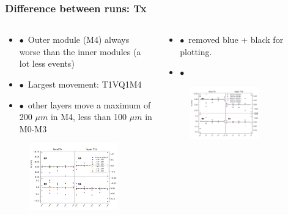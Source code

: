 \documentclass[aspectratio=1610, 12pt]{beamer}
\begin{document}
\begin{frame}\frametitle{Difference between runs: Tx}
  \begin{columns}
    \begin{column}[c]{0.48\textwidth}
      \begin{itemize}
        \item $\bullet$\, Outer module (M4) always worse than the inner modules (a lot less events)
        \item $\bullet$\, Largest movement: T1VQ1M4
        \item $\bullet$\, other layers move a maximum of 200 $\mu m$ in M4, less than 100 $\mu m$ in M0-M3
      \end{itemize}
      \begin{figure}
        \includegraphics[width=0.9\textwidth]{plots/stability_plots/diff_data_T1U_Tx.pdf}
      \end{figure}
    \end{column}
      \begin{column}[c]{0.48\textwidth}
        \begin{itemize}
          \item $\bullet$\, removed blue + black for plotting.
          \item $\bullet$\
        \end{itemize}
        \begin{figure}
          \includegraphics[width=0.7\textwidth]{plots/stability_plots/diff_reduced_Tx_T1U_Tx.pdf}

\end{figure}
\end{column}
\end{columns}
\end{frame}
\end{document}
